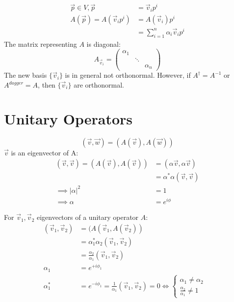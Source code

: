 \documentclass[cplx.tex]{subfiles}
\begin{document}
\begin{itemize}
        \begin{align}
            \vec{p} \in V, \vec{p} &= \vec{v}_ip^i \\
            A(\vec{p}) = A(\vec{v}_ip^i) &= A(\vec{v}_i)p^i \\
                       &= \sum_{i=1}^n \alpha_i\vec{v}_ip^i
        \end{align}
        The matrix representing $A$ is diagonal:
        \begin{equation}
            A_{\vec{v}_i} = \begin{pmatrix} \alpha_1 & & \\ & \ddots & \\ & & \alpha_n \end{pmatrix}
        \end{equation}
        The new basis $\{\vec{v}_i\}$ is in general not orthonormal. 
        However, if $A^\dagger = A^{-1}$ or $A^{dagger} = A$, then $\{\vec{v}_i\}$ are orthonormal.
\end{itemize}

\section{Unitary Operators}
\begin{equation}
    (\vec{v},\vec{w}) = (A(\vec{v}),A(\vec{w}))
\end{equation}
$\vec{v}$ is an eigenvector of A:
\begin{align}
    (\vec{v},\vec{v}) = (A(\vec{v}),A(\vec{v})) &= (\alpha\vec{v},\alpha\vec{v}) \\
                                                &= \alpha^*\alpha(\vec{v},\vec{v}) \\
    \implies |\alpha|^2 &= 1  \\
    \implies \alpha &= e^{i\phi}
\end{align}

For $\vec{v}_1,\vec{v}_2$ eigenvectors of a unitary operator $A$:
\begin{align}
    (\vec{v}_1,\vec{v}_2) &= (A(\vec{v}_1,A(\vec{v}_2)) \\
                          &= \alpha_1^*\alpha_2(\vec{v}_1,\vec{v}_2) \\
                          &= \frac{\alpha_2}{\alpha_1}(\vec{v}_1,\vec{v}_2) \\
    \alpha_1 &= e^{+i\phi_1} \\
    \alpha_1^* &= e^{-i\phi_1} = \frac{1}{\alpha_1}
    (\vec{v}_1,\vec{v}_2) = 0 \iff \begin{cases} \alpha_1 \neq \alpha_2 & \\ \frac{\alpha_2}{\alpha_1} \neq 1 & \end{cases}
\end{align}
\end{document}
